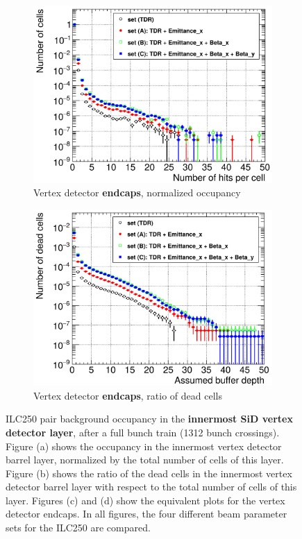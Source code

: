 \begin{figure}
  \begin{subfigure}[b]{0.49\textwidth}
   \centering
    \includegraphics[width=\textwidth]{Figures/Pairs/Occupancy_Comparison_Layer_0_numcells_ILC250_ALL_SETS_5T_w_antiDiD_SiVertexEndcap.png}
   \caption{Vertex detector \textbf{endcaps}, normalized occupancy}
   \end{subfigure}
   \hfill
    \begin{subfigure}[b]{0.49\textwidth}
   \centering
    \includegraphics[width=\textwidth]{Figures/Pairs/Occupancy_Comparison_Layer_0_deadcells_ILC250_ALL_SETS_5T_w_antiDiD_SiVertexEndcap.png}
   \caption{Vertex detector \textbf{endcaps}, ratio of dead cells}
   \end{subfigure}
   \caption[Pair background occupancy in the SiD vertex detector layer 0 for the ILC250]{ILC250 pair background occupancy in the \textbf{innermost SiD vertex detector layer}, after a full bunch train (1312 bunch crossings).
   Figure (a) shows the occupancy in the innermost vertex detector barrel layer, normalized by the total number of cells of this layer.
   Figure (b) shows the ratio of the dead cells in the innermost vertex detector barrel layer with respect to the total number of cells of this layer.
   Figures (c) and (d) show the equivalent plots for the vertex detector endcaps.
   In all figures, the four different beam parameter sets for the ILC250 are compared.
   }
   \label{fig:PairBkg:ILC250_Occupancy_Layer0}
 \end{figure}
